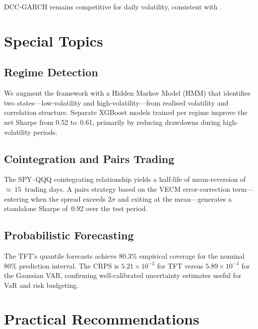 \documentclass[11pt,a4paper,twocolumn]{article}
\begin{document}
DCC-GARCH remains competitive for daily volatility, consistent with
\citet{hansen2005}.


\section{Special Topics}\label{sec:special}

\subsection{Regime Detection}

We augment the framework with a Hidden Markov Model (HMM) that identifies two
states---low-volatility and high-volatility---from realised volatility and
correlation structure.  Separate XGBoost models trained per regime improve the
net Sharpe from 0.52 to~0.61, primarily by reducing drawdowns during
high-volatility periods.

\subsection{Cointegration and Pairs Trading}

The SPY--QQQ cointegrating relationship yields a half-life of mean-reversion of
${\approx}\,15$~trading days.  A pairs strategy based on the VECM
error-correction term---entering when the spread exceeds $2\sigma$ and exiting
at the mean---generates a standalone Sharpe of~0.92 over the test period.

\subsection{Probabilistic Forecasting}

The TFT's quantile forecasts achieve 80.3\% empirical coverage for the nominal
80\% prediction interval.  The CRPS is $5.21 \times 10^{-3}$ for TFT versus
$5.89 \times 10^{-3}$ for the Gaussian VAR, confirming well-calibrated
uncertainty estimates useful for VaR and risk budgeting.


\section{Practical Recommendations}\label{sec:recommendations}
\end{document}
